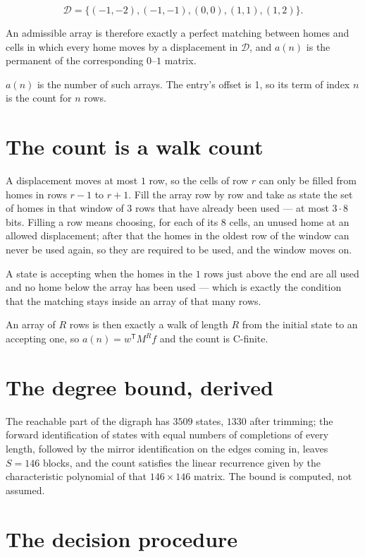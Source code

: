 \documentclass[11pt]{article}
\theoremstyle{definition}
\begin{document}
\[\mathcal{D} = \{(-1,-2), (-1,-1), (0,0), (1,1), (1,2)\}.\]

An admissible array is therefore exactly a perfect matching between homes and cells in which every home moves by a displacement in $\mathcal{D}$, and $a(n)$ is the permanent of the corresponding $0$--$1$ matrix.

$a(n)$ is the number of such arrays. The entry's offset is 1, so its term of index $n$ is the count for $n$ rows.

\section{The count is a walk count}

A displacement moves at most $1$ row, so the cells of row $r$ can only be filled from homes in rows $r-1$ to $r+1$. Fill the array row by row and take as state the set of homes in that window of $3$ rows that have already been used --- at most $3\cdot8$ bits. Filling a row means choosing, for each of its $8$ cells, an unused home at an allowed displacement; after that the homes in the oldest row of the window can never be used again, so they are required to be used, and the window moves on.

A state is accepting when the homes in the $1$ rows just above the end are all used and no home below the array has been used --- which is exactly the condition that the matching stays inside an array of that many rows.

An array of $R$ rows is then exactly a walk of length $R$ from the initial state to an accepting one, so $a(n) = w^{\mathsf T}M^{R}f$ and the count is C-finite.

\section{The degree bound, derived}

The reachable part of the digraph has $3509$ states, $1330$ after trimming; the forward identification of states with equal numbers of completions of every length, followed by the mirror identification on the edges coming in, leaves $S = 146$ blocks, and the count satisfies the linear recurrence given by the characteristic polynomial of that $146\times146$ matrix. The bound is computed, not assumed.

\section{The decision procedure}
\end{document}
